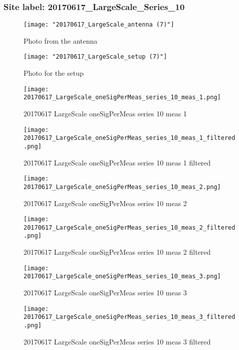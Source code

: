 \subsubsection{Site label: 20170617\_LargeScale\_Series\_10}
\begin{figure}[ht] \caption{Photo from the antenna}
\texttt{[image: "20170617\_LargeScale\_antenna (7)"]}\centering\end{figure}
\begin{figure}[ht] \caption{Photo for the setup}
\texttt{[image: "20170617\_LargeScale\_setup (7)"]}\centering\end{figure}
\begin{figure}[ht] \caption{20170617 LargeScale oneSigPerMeas series 10 meas 1}
\texttt{[image: 20170617\_LargeScale\_oneSigPerMeas\_series\_10\_meas\_1.png]}\centering\end{figure}
\begin{figure}[ht] \caption{20170617 LargeScale oneSigPerMeas series 10 meas 1 filtered}
\texttt{[image: 20170617\_LargeScale\_oneSigPerMeas\_series\_10\_meas\_1\_filtered.png]}\centering\end{figure}
\begin{figure}[ht] \caption{20170617 LargeScale oneSigPerMeas series 10 meas 2}
\texttt{[image: 20170617\_LargeScale\_oneSigPerMeas\_series\_10\_meas\_2.png]}\centering\end{figure}
\begin{figure}[ht] \caption{20170617 LargeScale oneSigPerMeas series 10 meas 2 filtered}
\texttt{[image: 20170617\_LargeScale\_oneSigPerMeas\_series\_10\_meas\_2\_filtered.png]}\centering\end{figure}
\begin{figure}[ht] \caption{20170617 LargeScale oneSigPerMeas series 10 meas 3}
\texttt{[image: 20170617\_LargeScale\_oneSigPerMeas\_series\_10\_meas\_3.png]}\centering\end{figure}
\begin{figure}[ht] \caption{20170617 LargeScale oneSigPerMeas series 10 meas 3 filtered}
\texttt{[image: 20170617\_LargeScale\_oneSigPerMeas\_series\_10\_meas\_3\_filtered.png]}\centering\end{figure}
\clearpage
